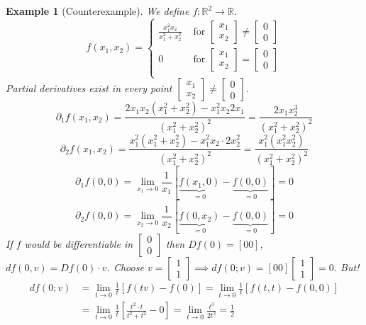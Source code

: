 \documentclass{article}
\newtheorem{example}{Example}  \numberwithin{example}{section}
\begin{document}
\begin{example}[Counterexample]
  We define $f: \mathbb R^2 \to \mathbb R$.
  \[
    f(x_1, x_2) = \begin{cases}
      \frac{x_1^2 x_2}{x_1^2 + x_2^2} & \text{ for } \begin{bmatrix} x_1 \\ x_2 \end{bmatrix} \neq \begin{bmatrix} 0 \\ 0 \end{bmatrix} \\
      0 & \text{ for } \begin{bmatrix} x_1 \\ x_2 \end{bmatrix} = \begin{bmatrix} 0 \\ 0 \end{bmatrix} \\
    \end{cases}
  \]
  Partial derivatives exist in every point $\begin{bmatrix} x_1 \\ x_2 \end{bmatrix} \neq \begin{bmatrix} 0 \\ 0 \end{bmatrix}$.
  \[ \partial_1 f(x_1, x_2) = \frac{2 x_1 x_2 (x_1^2 + x_2^2) - x_1^2 x_2 2x_1}{(x_1^2 + x_2^2)^2} = \frac{2 x_1 x_2^3}{(x_1^2 + x_2^2)^2} \]
  \[ \partial_2 f(x_1, x_2) = \frac{x_1^2 (x_1^2 + x_2^2) - x_1^2 x_2 \cdot 2x_2^2}{(x_1^2 + x_2^2)^2} = \frac{x_1^2 (x_1^2  x_2^2)}{(x_1^2 + x_2^2)^2} \]
  \[ \partial_1 f(0,0) = \lim_{x_1 \to 0} \frac{1}{x_1} [\underbrace{f(x_1, 0)}_{=0} - \underbrace{f(0, 0)}_{=0}] = 0 \]
  \[ \partial_2 f(0,0) = \lim_{x_2 \to 0} \frac{1}{x_2} [\underbrace{f(0, x_2)}_{=0} - \underbrace{f(0, 0)}_{=0}] = 0 \]
  If $f$ would be differentiable in $\begin{bmatrix} 0 \\ 0 \end{bmatrix}$ then $Df(0) = [0 0]$, $df(0, v) = Df(0) \cdot v$.
  Choose $v = \begin{bmatrix} 1 \\ 1 \end{bmatrix} \implies df(0; v) = [0 0]\begin{bmatrix} 1 \\ 1 \end{bmatrix} = 0$. But!
  \begin{align*}
    df(0; v)
    &= \lim_{t \to 0} \frac{1}{t} [f(tv) - f(0)]
    = \lim_{t \to 0} \frac{1}{t} [f(t, t) - f(0, 0)] \\
    &= \lim_{t \to 0} \frac 1t \left[\frac{t^2 \cdot t}{t^2 + t^2} - 0\right]
    = \lim_{t \to 0} \frac{t^3}{2t^3} = \frac12
  \end{align*}
\end{example}
\end{document}
